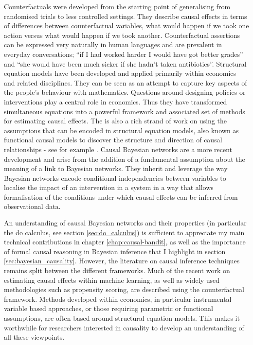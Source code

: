\documentclass[11pt,a4paper,twoside]{report}
\newcommand{\quotes}[1]{``#1''}
\theoremstyle{plain}
\theoremstyle{definition}
\begin{document}
Counterfactuals \citep{Rubin1974} were developed from the starting point of generalising from randomised trials to less controlled settings. They describe causal effects in terms of differences between counterfactual variables, what would happen if we took one action versus what would happen if we took another. Counterfactual assertions can be expressed very naturally in human languages and are  prevalent in  everyday conversations; \quotes{if I had worked harder I would have got better grades} and \quotes{she would have been much sicker if she hadn't taken antibiotics}. Structural equation models have been developed and applied primarily within economics and related disciplines. They can be seen as an attempt to capture key aspects of the people's behaviour with mathematics. Questions around designing policies or interventions play a central role in economics. Thus they have transformed simultaneous equations into a powerful framework and associated set of methods for estimating causal effects. The is also a rich strand of work on using the assumptions that can be encoded in structural equation models, also known as functional causal models to discover the structure and direction of causal relationships - see for example \citep{Mooij2016a,Peters2014}. Causal Bayesian networks \citep{Pearl2000} are a more recent development and arise from the addition of a fundamental assumption about the meaning of a link to Bayesian networks. They inherit and leverage the way Bayesian networks encode conditional independencies between variables to localise the impact of an intervention in a system in a way that allows formalisation of the conditions under which causal effects can be inferred from observational data. 

An understanding of causal Bayesian networks and their properties (in particular the do calculus, see section \ref{sec:do_calculus}) is sufficient to appreciate my main technical contributions in chapter \ref{chap:causal-bandit}, as well as the importance of formal causal reasoning in Bayesian inference that I highlight in section  \ref{sec:bayesian_causality}. However, the literature on causal inference techniques remains split between the different frameworks. Much of the recent work on estimating causal effects within machine learning, as well as widely used methodologies such as propensity scoring, are described using the counterfactual framework. Methods developed within economics, in particular instrumental variable based approaches, or those requiring parametric or functional assumptions, are often based around structural equation models. This makes it worthwhile for researchers interested in causality to develop an understanding of all these viewpoints.
\end{document}
